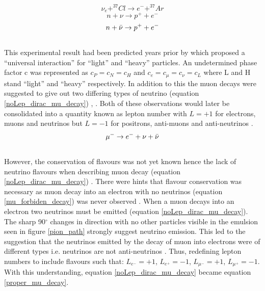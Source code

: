 \begin{equation}
    \nu_e + ^{37}Cl \rightarrow  e^- + ^{37}Ar
    \label{neutrino_chlorine_decay}
\end{equation}
\begin{equation}
    n + \nu \rightarrow p^+ + e^-
    \label{no_lepNo_dirac_nu_capture}
\end{equation}
\begin{equation}
    n + \Bar{\nu} \rightarrow p^+ + e^-
    \label{no_lepNo_maj_nu_capture}
\end{equation}
\\This experimental result had been predicted years prior by \cite{konopinski1953universal} which proposed a ``universal interaction'' for ``light'' and ``heavy'' particles. An undetermined phase factor c was represented as $c_P=c_N=c_H$ and $c_e=c_\mu=c_\nu=c_L$ where L and H stand ``light'' and ``heavy'' respectively. In addition to this the muon decays were suggested to give out two differing types of neutrino (equation \ref{noLep_dirac_mu_decay})  \cite{griffiths2008neutrino1.5}, \cite{konopinski1953universal}. Both of these observations would later be consolidated into a quantity known as lepton number with $L=+1$ for electrons, muons and neutrinos but $L=-1$ for positrons, anti-muons and anti-neutrinos \cite{griffiths2008neutrino1.5}. 
\begin{equation}
    \mu^- \rightarrow e^- + \nu + \Bar{\nu}
    \label{noLep_dirac_mu_decay}
\end{equation}
\\However, the conservation of flavours was not yet known hence the lack of neutrino flavours when describing muon decay (equation \ref{noLep_dirac_mu_decay})  \cite{griffiths2008neutrino1.5}. There were hints that flavour conservation was necessary as muon decay into an electron with no neutrinos (equation \ref{mu_forbiden_decay}) was never observed \cite{griffiths2008neutrino1.5}. When a muon decays into an electron two neutrinos must be emitted (equation \ref{noLep_dirac_mu_decay}). The sharp 90$^\circ$ changes in direction with no other particles visible in the emulsion seen in figure \ref{pion_path} strongly suggest neutrino emission. This led to the suggestion that the neutrinos emitted by the decay of muon into electrons were of different types i.e. neutrinos are not anti-neutrinos \cite{Lee:1960tja}  \cite{griffiths2008neutrino1.5}. Thus, redefining lepton numbers to include flavours such that: $L_{e^-} = +1$, $L_{e^+} = -1$, $L_{\mu^-} = +1 $, $L_{\mu^+} = -1 $. With this understanding, equation \ref{noLep_dirac_mu_decay} became equation \ref{proper_mu_decay}.
